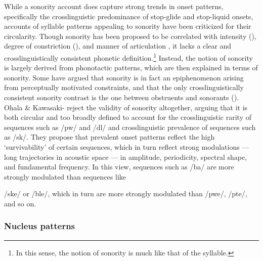   While a sonority account does capture strong trends in onset patterns, specifically the crosslinguistic predominance of stop-glide and stop-liquid onsets, accounts of syllable patterns appealing to sonority have been criticized for their circularity. Though sonority has been proposed to be correlated with intensity (\citealt{Gordon2002,Parker2002}), degree of constriction (\citealt{Chin1996,Cser2003}), and manner of articulation \citep{Parker2011}, it lacks a clear and crosslinguistically consistent phonetic definition.\footnote{{In this sense, the notion of sonority is much like that of the syllable.}} Instead, the notion of sonority is largely derived from phonotactic patterns, which are then explained in terms of sonority. Some have argued that sonority is in fact an epiphenomenon arising from perceptually motivated constraints, and that the only crosslinguistically consistent sonority contrast is the one between obstruents and sonorants (\citealt{JanyEtAl2007,HenkeEtAl2012}). Ohala \& Kawasaki-\citet{Fukumori1997} reject the validity of sonority altogether, arguing that it is both circular and too broadly defined to account for the crosslinguistic rarity of sequences such as /pw/ and /dl/ and crosslinguistic prevalence of sequences such as /sk/. They propose that prevalent onset patterns reflect the high ‘survivability’ of certain sequences, which in turn reflect strong modulations — long trajectories in acoustic space —  in amplitude, periodicity, spectral shape, and fundamental frequency. In this view, sequences such as /ba/ are more strongly modulated than sequences like 

/ske/ or /ble/, which in turn are more strongly modulated than /pwe/, /pte/, and so on.

\subsubsection{{Nucleus} {patterns}}\label{sec:1.1.2.4}

